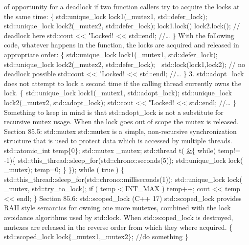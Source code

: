 of opportunity for a deadlock if two function callers try to acquire the
locks at the same time: \{ std::unique\_lock lock1(\_mutex1,
std::defer\_lock); std::unique\_lock lock2(\_mutex2, std::defer\_lock);
lock1.lock() lock2.lock(); // deadlock here std::cout
\textless\textless{} "Locked! \textless\textless{} std::endl; //\ldots{}
\} With the following code, whatever happens in the function, the locks
are acquired and released in appropriate order: \{ std::unique\_lock
lock1(\_mutex1, std::defer\_lock); std::unique\_lock lock2(\_mutex2,
std::defer\_lock);  std::lock(lock1,lock2); // no deadlock possible
std::cout \textless\textless{} "Locked! \textless\textless{} std::endl;
//\ldots{} \} 3. std::adopt\_lock does not attempt to lock a second time
if the calling thread currently owns the lock. \{ std::unique\_lock
lock1(\_mutex1, std::adopt\_lock); std::unique\_lock lock2(\_mutex2,
std::adopt\_lock); std::cout \textless\textless{} "Locked!
\textless\textless{} std::endl; //\ldots{} \} Something to keep in mind
is that std::adopt\_lock is not a substitute for recursive mutex usage.
When the lock goes out of scope the mutex is released. Section 85.5:
std::mutex std::mutex is a simple, non-recursive synchronization
structure that is used to protect data which is accessed by multiple
threads. std::atomic\_int temp\{0\}; std::mutex \_mutex; std::thread t(
\href{}{\&}\{ while( temp!= -1)\{
std::this\_thread::sleep\_for(std::chrono::seconds(5));
std::unique\_lock lock( \_mutex); temp=0; \} \}); while ( true ) \{
std::this\_thread::sleep\_for(std::chrono::milliseconds(1));
std::unique\_lock lock( \_mutex, std::try\_to\_lock); if ( temp
\textless{} INT\_MAX ) temp++; cout \textless\textless{} temp
\textless\textless{} endl; \} Section 85.6: std::scoped\_lock (C++ 17)
std::scoped\_lock provides RAII style semantics for owning one more
mutexes, combined with the lock avoidance algorithms used by std::lock.
When std::scoped\_lock is destroyed, mutexes are released in the reverse
order from which they where acquired. \{ std::scoped\_lock
lock\{\_mutex1,\_mutex2\}; //do something \}
